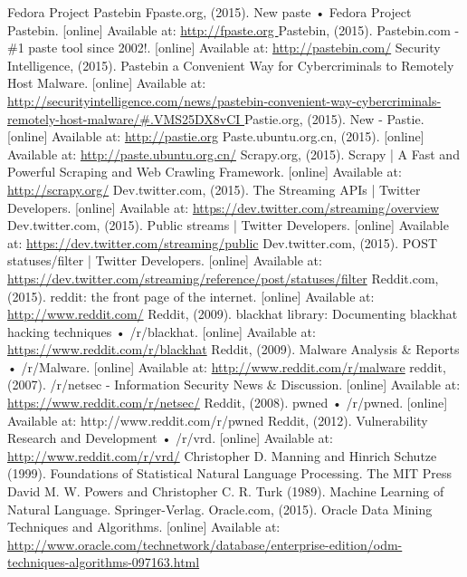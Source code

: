 \documentclass[12pt]{article}
\begin{document}
\begin{thebibliography}{99}
Fedora Project Pastebin Fpaste.org, (2015). New paste • Fedora Project Pastebin. [online] Available at:  
\url{http://fpaste.org }
Pastebin, (2015). Pastebin.com - \#1 paste tool since 2002!. [online] Available at:     \url{http://pastebin.com/}
Security Intelligence, (2015). Pastebin a Convenient Way for Cybercriminals to Remotely Host Malware. [online] Available at: \url{http://securityintelligence.com/news/pastebin-convenient-way-cybercriminals-remotely-host-malware/#.VMS25DX8vCI }
Pastie.org, (2015). New - Pastie. [online] Available at: \url{http://pastie.org} 
 Paste.ubuntu.org.cn, (2015). [online] Available at: \url{http://paste.ubuntu.org.cn/}
Scrapy.org, (2015). Scrapy | A Fast and Powerful Scraping and Web Crawling Framework. [online] Available at: \url{http://scrapy.org/} 
Dev.twitter.com, (2015). The Streaming APIs | Twitter Developers. [online] Available at: \url{https://dev.twitter.com/streaming/overview}
Dev.twitter.com, (2015). Public streams | Twitter Developers. [online] Available at: \url{https://dev.twitter.com/streaming/public}
Dev.twitter.com, (2015). POST statuses/filter | Twitter Developers. [online] Available at: \url{https://dev.twitter.com/streaming/reference/post/statuses/filter}
Reddit.com, (2015). reddit: the front page of the internet. [online] Available at: \url{http://www.reddit.com/} 
Reddit, (2009). blackhat library: Documenting blackhat hacking techniques • /r/blackhat. [online] Available at: \url{https://www.reddit.com/r/blackhat}
Reddit, (2009). Malware Analysis \& Reports • /r/Malware. [online] Available at:   \url{http://www.reddit.com/r/malware}
reddit, (2007). /r/netsec - Information Security News \& Discussion. [online] Available at: \url{https://www.reddit.com/r/netsec/} 
Reddit, (2008). pwned • /r/pwned. [online] Available at: http://www.reddit.com/r/pwned 
Reddit, (2012). Vulnerability Research and Development • /r/vrd. [online] Available at: \url{http://www.reddit.com/r/vrd/}
Christopher D. Manning and Hinrich Schutze (1999). Foundations of Statistical Natural Language Processing. The MIT Press
David M. W. Powers and Christopher C. R. Turk (1989). Machine Learning of Natural Language. Springer-Verlag. 
Oracle.com, (2015). Oracle Data Mining Techniques and Algorithms. [online] Available at: \url{http://www.oracle.com/technetwork/database/enterprise-edition/odm-techniques-algorithms-097163.html}

\end{thebibliography}
\end{document}
